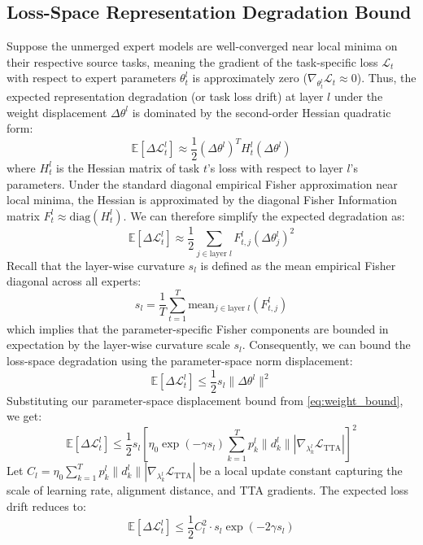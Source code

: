\documentclass{article}
\begin{document}
\subsection{Loss-Space Representation Degradation Bound}
Suppose the unmerged expert models are well-converged near local minima on their respective source tasks, meaning the gradient of the task-specific loss $\mathcal{L}_t$ with respect to expert parameters $\theta_t^l$ is approximately zero ($\nabla_{\theta_t^l} \mathcal{L}_t \approx 0$). Thus, the expected representation degradation (or task loss drift) at layer $l$ under the weight displacement $\Delta \theta^l$ is dominated by the second-order Hessian quadratic form:
\begin{equation}
    \mathbb{E}[\Delta \mathcal{L}_t^l] \approx \frac{1}{2} (\Delta \theta^l)^T H_t^l (\Delta \theta^l)
\end{equation}
where $H_t^l$ is the Hessian matrix of task $t$'s loss with respect to layer $l$'s parameters. Under the standard diagonal empirical Fisher approximation near local minima, the Hessian is approximated by the diagonal Fisher Information matrix $F_t^l \approx \text{diag}(H_t^l)$. We can therefore simplify the expected degradation as:
\begin{equation}
    \mathbb{E}[\Delta \mathcal{L}_t^l] \approx \frac{1}{2} \sum_{j \in \text{layer } l} F_{t, j}^l (\Delta \theta^l_j)^2
\end{equation}
Recall that the layer-wise curvature $s_l$ is defined as the mean empirical Fisher diagonal across all experts:
\begin{equation}
    s_l = \frac{1}{T} \sum_{t=1}^T \text{mean}_{j \in \text{layer } l} (F_{t, j}^l)
\end{equation}
which implies that the parameter-specific Fisher components are bounded in expectation by the layer-wise curvature scale $s_l$. Consequently, we can bound the loss-space degradation using the parameter-space norm displacement:
\begin{equation}
    \mathbb{E}[\Delta \mathcal{L}_t^l] \le \frac{1}{2} s_l \|\Delta \theta^l\|^2
\end{equation}
Substituting our parameter-space displacement bound from \cref{eq:weight_bound}, we get:
\begin{equation}
    \mathbb{E}[\Delta \mathcal{L}_t^l] \le \frac{1}{2} s_l \left[ \eta_0 \exp(-\gamma s_l) \sum_{k=1}^T p_k^l \|d_k^l\| |\nabla_{\lambda^l_k} \mathcal{L}_{\text{TTA}}| \right]^2
\end{equation}
Let $C_l = \eta_0 \sum_{k=1}^T p_k^l \|d_k^l\| |\nabla_{\lambda^l_k} \mathcal{L}_{\text{TTA}}|$ be a local update constant capturing the scale of learning rate, alignment distance, and TTA gradients. The expected loss drift reduces to:
\begin{equation}
    \mathbb{E}[\Delta \mathcal{L}_t^l] \le \frac{1}{2} C_l^2 \cdot s_l \exp(-2 \gamma s_l)
\end{equation}
\end{document}
